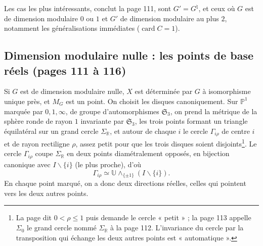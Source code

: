 \documentclass[11pt,a4paper]{article}
\begin{document}
Les cas les plus intéressants, conclut la page 111, sont $G' = G^\natural$, et
ceux où $G$ est de dimension modulaire $0$ ou $1$ et $G'$ de dimension
modulaire au plus $2$, notamment les généralisations immédiates
($\operatorname{card} C = 1$).

\subsection*{Dimension modulaire nulle : les points de base réels (pages 111 à
116)}

Si $G$ est de dimension modulaire nulle, $X$ est déterminée par $G$ à
isomorphisme unique près, et $M_G$ est un point. On choisit les disques
canoniquement. Sur $\mathbb{P}^1$ marquée par $0, 1, \infty$, de groupe
d'automorphismes $\mathfrak{S}_3$, on prend la métrique de la sphère ronde de
rayon $1$ invariante par $\mathfrak{S}_3$, les trois points formant un
triangle équilatéral sur un grand cercle $\Sigma_{\mathbb{R}}$, et autour de
chaque $i$ le cercle $\Gamma_{i\rho}$ de centre $i$ et de rayon rectiligne
$\rho$, assez petit pour que les trois disques soient disjoints\footnote{La
page dit $0 < \rho \leq 1$ puis demande le cercle « petit » ; la page 113
appelle $\Sigma_0$ le grand cercle nommé $\Sigma_{\mathbb{R}}$ à la page 112.
L'invariance du cercle par la transposition qui échange les deux autres
points est « automatique ».}. Le cercle $\Gamma_{i\rho}$ coupe
$\Sigma_{\mathbb{R}}$ en deux points diamétralement opposés, en bijection
canonique avec $I \smallsetminus \{i\}$ (le plus proche), d'où
\[
\Gamma_{i\rho} \simeq \mathbb{U} \wedge_{\{\pm1\}} (I \smallsetminus \{i\}).
\]
En chaque point marqué, on a donc deux directions réelles, celles qui
pointent vers les deux autres points.
\end{document}
